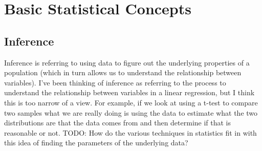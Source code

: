 \documentclass[paper=a4, fontsize=11pt]{scrartcl} %
\numberwithin{equation}{section} %
\numberwithin{figure}{section} %
\numberwithin{table}{section} %
\begin{document}
\section{Basic Statistical Concepts}

\subsection{Inference}

Inference is referring to using data to figure out the underlying properties of a population (which in turn allows us to understand the relationship between variables). I've been thinking of inference as referring to the process to understand the relationship between variables in a linear regression, but I think this is too narrow of a view. For example, if we look at using a t-test to compare two samples what we are really doing is using the data to estimate what the two distributions are that the data comes from and then determine if that is reasonable or not. TODO: How do the various techniques in statistics fit in with this idea of finding the parameters of the underlying data?


\clearpage
\printglossaries
\end{document}
